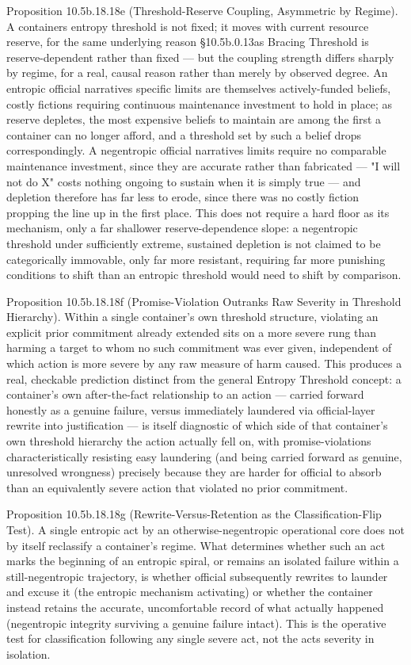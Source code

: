 \documentclass[
]{article}
\begin{document}
Proposition 10.5b.18.18e (Threshold-Reserve Coupling, Asymmetric by
Regime). A containers entropy threshold is not fixed; it moves with
current resource reserve, for the same underlying reason §10.5b.0.13as
Bracing Threshold is reserve-dependent rather than fixed --- but the
coupling strength differs sharply by regime, for a real, causal reason
rather than merely by observed degree. An entropic official narratives
specific limits are themselves actively-funded beliefs, costly fictions
requiring continuous maintenance investment to hold in place; as reserve
depletes, the most expensive beliefs to maintain are among the first a
container can no longer afford, and a threshold set by such a belief
drops correspondingly. A negentropic official narratives limits require
no comparable maintenance investment, since they are accurate rather
than fabricated --- "I will not do X" costs nothing ongoing to sustain
when it is simply true --- and depletion therefore has far less to
erode, since there was no costly fiction propping the line up in the
first place. This does not require a hard floor as its mechanism, only a
far shallower reserve-dependence slope: a negentropic threshold under
sufficiently extreme, sustained depletion is not claimed to be
categorically immovable, only far more resistant, requiring far more
punishing conditions to shift than an entropic threshold would need to
shift by comparison.

Proposition 10.5b.18.18f (Promise-Violation Outranks Raw Severity in
Threshold Hierarchy). Within a single container's own threshold
structure, violating an explicit prior commitment already extended sits
on a more severe rung than harming a target to whom no such commitment
was ever given, independent of which action is more severe by any raw
measure of harm caused. This produces a real, checkable prediction
distinct from the general Entropy Threshold concept: a container's own
after-the-fact relationship to an action --- carried forward honestly as
a genuine failure, versus immediately laundered via official-layer
rewrite into justification --- is itself diagnostic of which side of
that container's own threshold hierarchy the action actually fell on,
with promise-violations characteristically resisting easy laundering
(and being carried forward as genuine, unresolved wrongness) precisely
because they are harder for official to absorb than an equivalently
severe action that violated no prior commitment.

Proposition 10.5b.18.18g (Rewrite-Versus-Retention as the
Classification-Flip Test). A single entropic act by an
otherwise-negentropic operational core does not by itself reclassify a
container's regime. What determines whether such an act marks the
beginning of an entropic spiral, or remains an isolated failure within a
still-negentropic trajectory, is whether official subsequently rewrites
to launder and excuse it (the entropic mechanism activating) or whether
the container instead retains the accurate, uncomfortable record of what
actually happened (negentropic integrity surviving a genuine failure
intact). This is the operative test for classification following any
single severe act, not the acts severity in isolation.
\end{document}
